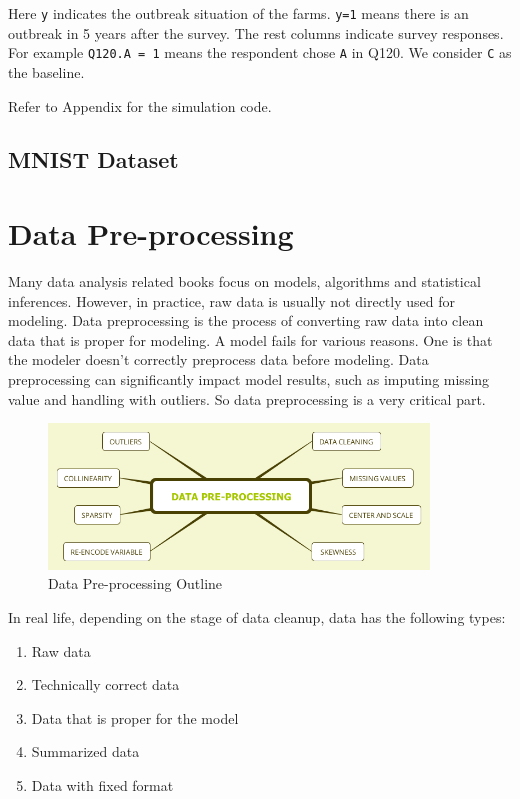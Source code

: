 \documentclass[12pt,]{krantz}
\providecommand{\tightlist}{%
  \setlength{\itemsep}{0pt}\setlength{\parskip}{0pt}}
\theoremstyle{definition}
\theoremstyle{definition}
\theoremstyle{definition}
\theoremstyle{remark}
\begin{document}
Here \texttt{y} indicates the outbreak situation of the farms.
\texttt{y=1} means there is an outbreak in 5 years after the survey. The
rest columns indicate survey responses. For example
\texttt{Q120.A\ =\ 1} means the respondent chose \texttt{A} in Q120. We
consider \texttt{C} as the baseline.

Refer to Appendix for the simulation code.

\section{MNIST Dataset}\label{mnist-dataset}

\chapter{Data Pre-processing}\label{data-pre-processing}

Many data analysis related books focus on models, algorithms and
statistical inferences. However, in practice, raw data is usually not
directly used for modeling. Data preprocessing is the process of
converting raw data into clean data that is proper for modeling. A model
fails for various reasons. One is that the modeler doesn't correctly
preprocess data before modeling. Data preprocessing can significantly
impact model results, such as imputing missing value and handling with
outliers. So data preprocessing is a very critical part.

\begin{figure}
\centering
\includegraphics[width=0.90000\textwidth]{images/DataPre-processing.png}
\caption{Data Pre-processing Outline}
\end{figure}

In real life, depending on the stage of data cleanup, data has the
following types:

\begin{enumerate}
\def\labelenumi{\arabic{enumi}.}
\tightlist
\item
  Raw data
\item
  Technically correct data
\item
  Data that is proper for the model
\item
  Summarized data
\item
  Data with fixed format
\end{enumerate}
\end{document}

